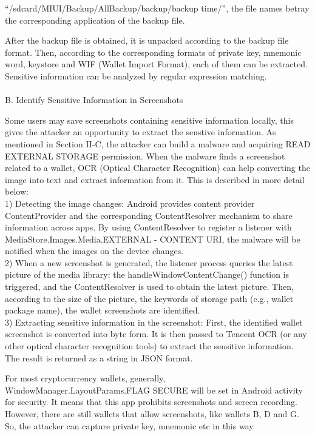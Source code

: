 \documentclass[12pt]{article}
\begin{document}
“/sdcard/MIUI/Backup/AllBackup/backup/backup time/”, the
file names betray the corresponding application of the backup
file.\par
After the backup file is obtained, it is unpacked according
to the backup file format. Then, according to the corresponding formats of private key, mnemonic word, keystore and
WIF (Wallet Import Format), each of them can be extracted.
Sensitive information can be analyzed by regular expression
matching.
\\
\\
B. Identify Sensitive Information in Screenshots 
\par
Some users may save screenshots containing sensitive
information locally, this gives the attacker an opportunity
to extract the senstive information. As mentioned in Section II-C, the attacker can build a malware and acquiring
READ EXTERNAL STORAGE permission. When the malware finds a screenshot related to a wallet, OCR (Optical
Character Recognition) can help converting the image into
text and extract information from it. This is described in more
detail below:
\\
1) Detecting the image changes: Android provides content provider ContentProvider and the corresponding ContentResolver mechanism to share information
across apps. By using ContentResolver to register a
listener with MediaStore.Images.Media.EXTERNAL -
CONTENT URI, the malware will be notified when
the images on the device changes.
\\
2) When a new screenshot is generated, the listener process queries the latest picture of the media library: the
handleWindowContentChange() function is triggered,
and the ContentResolver is used to obtain the latest
picture. Then, according to the size of the picture, the
keywords of storage path (e.g., wallet package name),
the wallet screenshots are identified.
\\
3) Extracting sensitive information in the screenshot: First,
the identified wallet screenshot is converted into byte
form. It is then passed to Tencent OCR (or any other
optical character recognition tools) to extract the sensitive information. The result is returned as a string in
JSON format.
\par
For most cryptocurrency wallets, generally, WindowManager.LayoutParams.FLAG SECURE will be set in Android
activity for security. It means that this app prohibits screenshots and screen recording. However, there are still wallets
that allow screenshots, like wallets B, D and G. So, the
attacker can capture private key, mnemonic etc in this way.
\end{document}
